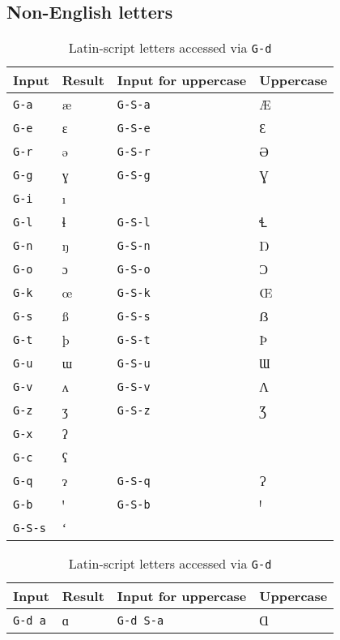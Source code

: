 \documentclass[oneside]{memoir}
\newcommand{\key}{\verb}
\begin{document}
\subsection{Non-English letters}
\label{sec:non-eng_letters}

\begin{table}
\centering
\begin{minipage}{0.4\linewidth}
\centering
\caption{Latin-script letters accessed via a single key}
\label{tab:single_key}
\begin{tabular}{llll}
\toprule
Input & Result & Input for uppercase & Uppercase \\
\midrule
\key|G-a| & æ & \key|G-S-a| & Æ \\
\key|G-e| & ɛ & \key|G-S-e| & Ɛ \\
\key|G-r| & ə & \key|G-S-r| & Ə \\
\key|G-g| & ɣ & \key|G-S-g| & Ɣ \\
\key|G-i| & ı &             &  \\
\key|G-l| & ɬ & \key|G-S-l| & Ɬ \\
\key|G-n| & ŋ & \key|G-S-n| & Ŋ \\
\key|G-o| & ɔ & \key|G-S-o| & Ɔ \\
\key|G-k| & œ & \key|G-S-k| & Œ \\
\key|G-s| & ß & \key|G-S-s| & ẞ \\
\key|G-t| & þ & \key|G-S-t| & Þ \\
\key|G-u| & ɯ & \key|G-S-u| & Ɯ \\
\key|G-v| & ʌ & \key|G-S-v| & Ʌ \\
\key|G-z| & ʒ & \key|G-S-z| & Ʒ \\
\key|G-x| & ʔ &             &  \\
\key|G-c| & ʕ &             &  \\
\key|G-q| & ɂ & \key|G-S-q| & Ɂ \\
\key|G-b| & ꞌ & \key|G-S-b| & Ꞌ \\
\key|G-S-s| & ʻ &             &  \\
\bottomrule
\end{tabular}
\end{minipage}\hfill
\begin{minipage}{0.4\linewidth}
\centering
\cprotect\caption{Latin-script letters accessed via \key|G-d|}
\label{tab:letters_g-d}
\begin{tabular}{llll}
\toprule
Input & Result & Input for uppercase & Uppercase \\
\midrule
\key|G-d a| & ɑ       & \key|G-d S-a| & Ɑ \\

\end{tabular}
\end{minipage}
\end{table}
\end{document}
